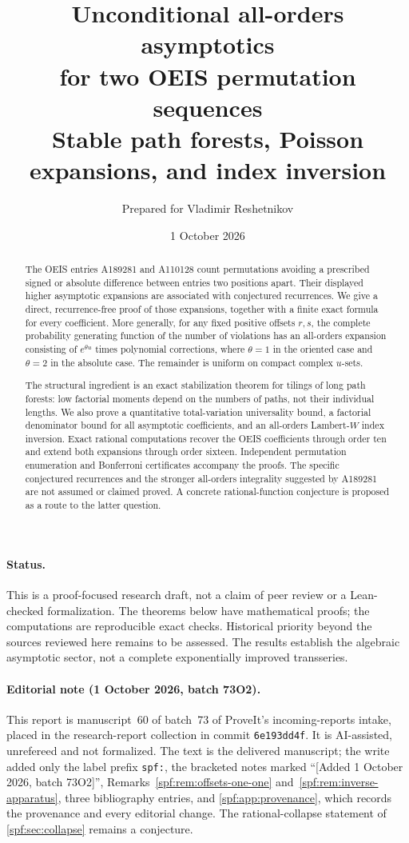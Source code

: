 \documentclass[11pt]{article}
\title{\textbf{Unconditional all-orders asymptotics\\for two OEIS permutation sequences}\\[5pt]
\large Stable path forests, Poisson expansions, and index inversion}
\author{Prepared for Vladimir Reshetnikov}
\date{1 October 2026}
\numberwithin{equation}{section}
\theoremstyle{definition}
\theoremstyle{remark}
\theoremstyle{definition}
\begin{document}
\maketitle
\begin{abstract}
The OEIS entries A189281 and A110128 count permutations avoiding a prescribed
signed or absolute difference between entries two positions apart. Their displayed
higher asymptotic expansions are associated with conjectured recurrences. We give
a direct, recurrence-free proof of those expansions, together with a finite exact
formula for every coefficient. More generally, for any fixed positive offsets
$r,s$, the complete probability generating function of the number of violations
has an all-orders expansion consisting of $e^{\theta u}$ times polynomial
corrections, where $\theta=1$ in the oriented case and $\theta=2$ in the absolute
case. The remainder is uniform on compact complex $u$-sets.

The structural ingredient is an exact stabilization theorem for tilings of long
path forests: low factorial moments depend on the numbers of paths, not their
individual lengths. We also prove a quantitative total-variation universality
bound, a factorial denominator bound for all asymptotic coefficients, and an
all-orders Lambert-$W$ index inversion. Exact rational computations recover the
OEIS coefficients through order ten and extend both expansions through order
sixteen. Independent permutation enumeration and Bonferroni certificates accompany
the proofs. The specific conjectured recurrences and the stronger all-orders
integrality suggested by A189281 are not assumed or claimed proved. A concrete
rational-function conjecture is proposed as a route to the latter question.
\end{abstract}

\paragraph{Status.}
This is a proof-focused research draft, not a claim of peer review or a
Lean-checked formalization. The theorems below have mathematical proofs; the
computations are reproducible exact checks. Historical priority beyond the
sources reviewed here remains to be assessed. The results establish the
algebraic asymptotic sector, not a complete exponentially improved transseries.

\paragraph{Editorial note (1 October 2026, batch 73O2).}
This report is manuscript~60 of batch~73 of ProveIt's incoming-reports intake,
placed in the research-report collection in commit \texttt{6e193dd4f}. It is
AI-assisted, unrefereed and not formalized. The text is the delivered
manuscript; the write added only the label prefix \texttt{spf:}, the bracketed
notes marked ``[Added 1 October 2026, batch 73O2]'',
Remarks~\ref{spf:rem:offsets-one-one} and~\ref{spf:rem:inverse-apparatus}, three bibliography
entries, and \cref{spf:app:provenance}, which records the provenance and every
editorial change. The rational-collapse statement of \cref{spf:sec:collapse}
remains a conjecture.
\end{document}
